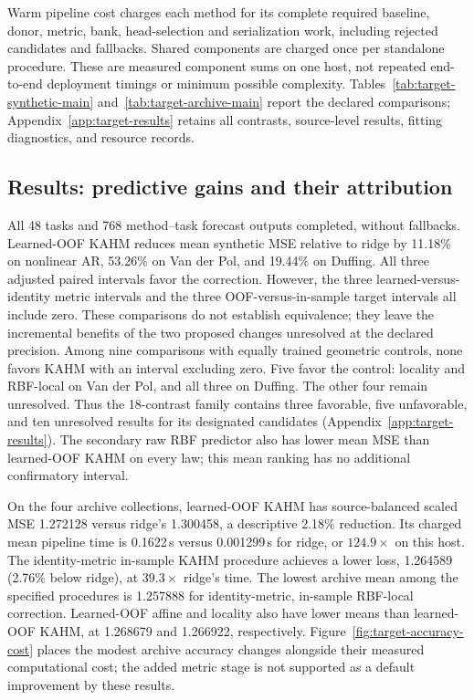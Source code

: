 Warm pipeline cost charges each method for its complete required
baseline, donor, metric, bank, head-selection and serialization work,
including rejected candidates and fallbacks. Shared components are
charged once per standalone procedure. These are measured component
sums on one host, not repeated end-to-end deployment timings or minimum
possible complexity. Tables~\ref{tab:target-synthetic-main}
and~\ref{tab:target-archive-main} report the declared comparisons;
Appendix~\ref{app:target-results} retains all contrasts, source-level
results, fitting diagnostics, and resource records.

\subsection{Results: predictive gains and their attribution}
\label{sec:target-results}

All 48 tasks and 768 method--task forecast outputs completed, without
fallbacks. Learned-OOF KAHM reduces mean synthetic MSE relative to ridge
by 11.18\% on nonlinear AR, 53.26\% on Van der Pol, and 19.44\% on
Duffing. All three adjusted paired intervals favor the correction.
However, the three learned-versus-identity metric intervals and the
three OOF-versus-in-sample target intervals all include zero. These
comparisons do not establish equivalence; they leave the incremental
benefits of the two proposed changes unresolved at the declared
precision. Among nine comparisons with equally trained geometric
controls, none favors KAHM with an interval excluding zero. Five favor
the control: locality and RBF-local on Van der Pol, and all three on
Duffing. The other four remain unresolved. Thus the 18-contrast family
contains three favorable, five unfavorable, and ten unresolved results
for its designated candidates
(Appendix~\ref{app:target-results}). The secondary raw RBF predictor
also has lower mean MSE than learned-OOF KAHM on every law; this mean
ranking has no additional confirmatory interval.

On the four archive collections, learned-OOF KAHM has
source-balanced scaled MSE 1.272128 versus ridge's 1.300458, a
descriptive 2.18\% reduction. Its charged mean pipeline time is
0.1622\,s versus 0.001299\,s for ridge, or $124.9\times$ on this host.
The identity-metric in-sample KAHM procedure achieves a lower loss,
1.264589 (2.76\% below ridge), at $39.3\times$ ridge's time. The
lowest archive mean among the specified procedures is 1.257888 for identity-metric,
in-sample RBF-local correction. Learned-OOF affine and locality also
have lower means than learned-OOF KAHM, at 1.268679 and 1.266922,
respectively. Figure~\ref{fig:target-accuracy-cost} places the modest
archive accuracy changes alongside their measured computational cost;
the added metric stage is not supported as a default improvement by
these results.

